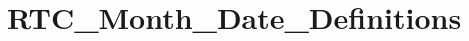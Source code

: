\hypertarget{group___r_t_c___month___date___definitions}{\section{R\-T\-C\-\_\-\-Month\-\_\-\-Date\-\_\-\-Definitions}
\label{group___r_t_c___month___date___definitions}
}
